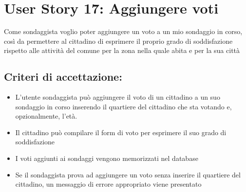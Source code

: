 \section*{User Story 17: Aggiungere voti}
    Come sondaggista voglio poter aggiungere un voto a un mio sondaggio in corso, così da permettere al cittadino di esprimere il proprio grado di soddisfazione rispetto alle attività del comune per la zona nella quale abita e per la sua città
    \subsection*{Criteri di accettazione:}  
    \begin{itemize}  
        \item L'utente sondaggista può aggiungere il voto di un cittadino a un suo sondaggio in corso inserendo il quartiere del cittadino che sta votando e, opzionalmente, l'età.
        \item Il cittadino può compilare il form di voto per esprimere il suo grado di soddisfazione
        \item I voti aggiunti ai sondaggi vengono memorizzati nel database
        \item Se il sondaggista prova ad aggiungere un voto senza inserire il quartiere del cittadino, un messaggio di errore appropriato viene presentato
    \end{itemize}  
